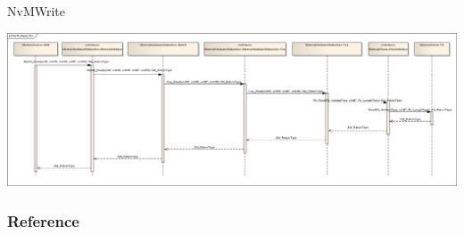 NvMWrite
\begin{center}
\includegraphics[scale=0.2]{Images/NvM_Read_Fls_DynamicBehavior_Overview.png}
\end{center}

\subsubsection{Reference}

